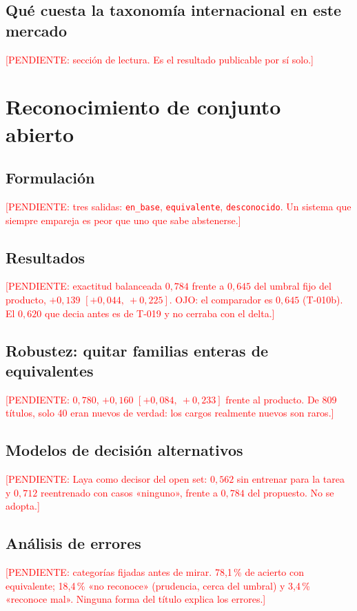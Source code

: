 \documentclass[12pt,a4paper,oneside]{report}
\newcommand{\pend}[1]{\textcolor{red}{\small[PENDIENTE: #1]}}
\begin{document}
\section{Qué cuesta la taxonomía internacional en este mercado}
\pend{sección de lectura. Es el resultado publicable por sí solo.}

\chapter{Reconocimiento de conjunto abierto}
\label{cap:openset}

\section{Formulación}
\pend{tres salidas: \texttt{en\_base}, \texttt{equivalente}, \texttt{desconocido}. Un
sistema que siempre empareja es peor que uno que sabe abstenerse.}

\section{Resultados}
\pend{exactitud balanceada $0{,}784$ frente a $0{,}645$ del umbral fijo del producto,
$+0{,}139$ $[+0{,}044,\ +0{,}225]$. OJO: el comparador es $0{,}645$ (T-010b). El
$0{,}620$ que decia antes es de T-019 y no cerraba con el delta.}

\section{Robustez: quitar familias enteras de equivalentes}
\pend{$0{,}780$, $+0{,}160$ $[+0{,}084,\ +0{,}233]$ frente al producto. De 809 títulos,
solo 40 eran nuevos de verdad: los cargos realmente nuevos son raros.}

\section{Modelos de decisión alternativos}
\pend{Laya como decisor del open set: $0{,}562$ sin entrenar para la tarea y $0{,}712$
reentrenado con casos «ninguno», frente a $0{,}784$ del propuesto. No se adopta.}

\section{Análisis de errores}
\pend{categorías fijadas antes de mirar. 78,1\,\% de acierto con equivalente; 18,4\,\% «no
reconoce» (prudencia, cerca del umbral) y 3,4\,\% «reconoce mal». Ninguna forma del título
explica los errores.}
\end{document}
